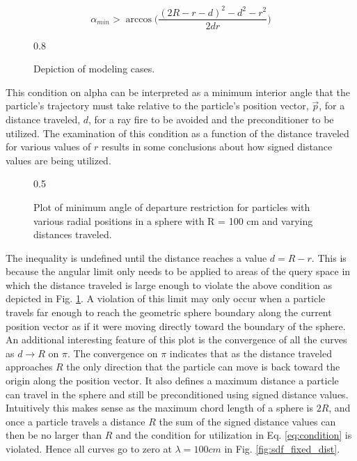 \begin{equation}
\alpha_{min} > \arccos\Bigg ( \frac{(2R-r-d)^2-d^2-r^2}{2 d r} \Bigg )
\end{equation}

\begin{figure}[ht]
  \centering
  {0.8\textwidth}
  \caption{Depiction of modeling cases.}
  \label{fig:modeling_cases}
\end{figure}

This condition on alpha can be interpreted as a minimum interior angle that the
particle's trajectory must take relative to the particle's position vector,
$\vec{p}$, for a distance traveled, $d$, for a ray fire to be avoided and the
preconditioner to be utilized. The examination of this condition as a function
of the distance traveled for various values of $r$ results in some conclusions
about how signed distance values are being utilized.

\begin{figure}
\centering
{0.5\textwidth}
\caption{Plot of minimum angle of departure restriction for particles with
various radial positions in a sphere with R = 100 cm and varying distances traveled.}
\end{figure}

The inequality is undefined until the distance reaches a value $d = R- r$. This
is because the angular limit only needs to be applied to areas of the query
space in which the distance traveled is large enough to violate the above
condition as depicted in Fig. \ref{fig:modeling_cases}. A violation of this
limit may only occur when a particle travels far enough to reach the geometric
sphere boundary along the current position vector as if it were moving directly
toward the boundary of the sphere. An additional interesting feature of this
plot is the convergence of all the curves as $d \rightarrow R$ on $\pi$. The
convergence on $\pi$ indicates that as the distance traveled approaches $R$ the
only direction that the particle can move is back toward the origin along the
position vector. It also defines a maximum distance a particle can travel in the
sphere and still be preconditioned using signed distance values. Intuitively
this makes sense as the maximum chord length of a sphere is $2R$, and once a
particle travels a distance $R$ the sum of the signed distance values can then
be no larger than $R$ and the condition for utilization in Eq. \ref{eq:condition} is
violated. Hence all curves go to zero at $\lambda = 100 cm$ in
Fig. \ref{fig:sdf_fixed_dist}.


